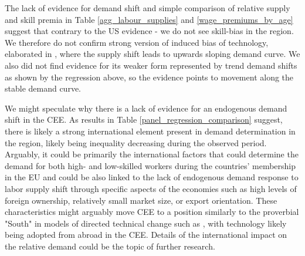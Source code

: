 \documentclass[11pt]{article}
\begin{document}

The lack of evidence for demand shift and simple comparison of relative supply and skill premia in Table \ref{agg_labour_supplies} and \ref{wage_premiums_by_age} suggest that contrary to the US evidence - we do not see skill-bias in the region. We therefore do not confirm strong version of induced bias of technology, elaborated in \cite{acemoglu2002directed}, where the supply shift leads to upwards sloping demand curve. We also did not find evidence for its weaker form represented by trend demand shifts as shown by the regression above, so the evidence points to movement along the stable demand curve.

We might speculate why there is a lack of evidence for an endogenous demand shift in the CEE. As results in Table \ref{panel_regression_comparison} suggest, there is likely a strong international element present in demand determination in the region, likely being inequality decreasing during the observed period. Arguably, it could be primarily the international factors that could determine the demand for both high- and low-skilled workers during the countries' membership in the EU and could be also linked to the lack of endogenous demand response to labor supply shift through specific aspects of the economies such as high levels of foreign ownership, relatively small market size, or export orientation. These characteristics might arguably move CEE to a position similarly to the proverbial "South" in models of directed technical change such as \cite{acemoglu2002directed}, with technology likely being adopted from abroad in the CEE. Details of the international impact on the relative demand could be the topic of further  research.



\end{document}
